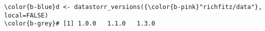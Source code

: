 \documentclass[class=minimal,border=0]{standalone}
\begin{document}
%
\begin{BVerbatim}[bgcolor=b-darkgrey]
\color{b-blue}d <- datastorr_versions({\color{b-pink}"richfitz/data"}, local=FALSE)
\color{b-grey}# [1] 1.0.0   1.1.0   1.3.0
\end{BVerbatim}
\end{document}
